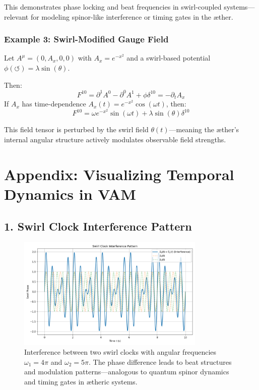 \documentclass[12pt]{article}
\begin{document}
This demonstrates phase locking and beat frequencies in swirl-coupled systems—relevant for modeling spinor-like interference or timing gates in the æther.

\subsubsection*{Example 3: Swirl-Modified Gauge Field}
Let $A^\mu = (0, A_x, 0, 0)$ with $A_x = e^{-x^2}$ and a swirl-based potential $\phi(\circlearrowleft) = \lambda \sin(\theta)$.

Then:
\[
F^{1 0} = \partial^1 A^0 - \partial^0 A^1 + \phi \delta^{1 0} = -\partial_t A_x
\]
If $A_x$ has time-dependence $A_x(t) = e^{-x^2} \cos(\omega t)$, then:
\[
F^{1 0} = \omega e^{-x^2} \sin(\omega t) + \lambda \sin(\theta) \delta^{1 0}
\]

This field tensor is perturbed by the swirl field $\theta(t)$—meaning the æther’s internal angular structure actively modulates observable field strengths.

\section*{Appendix: Visualizing Temporal Dynamics in VAM}

\subsection*{1. Swirl Clock Interference Pattern}
\begin{figure}[H]
    \centering
    \includegraphics[width=0.8\textwidth]{../images/SwirlClockInterference}
    \caption{Interference between two swirl clocks with angular frequencies $\omega_1 = 4\pi$ and $\omega_2 = 5\pi$. The phase difference leads to beat structures and modulation patterns—analogous to quantum spinor dynamics and timing gates in ætheric systems.}
    \label{fig:swirl_interference}
\end{figure}
\end{document}
